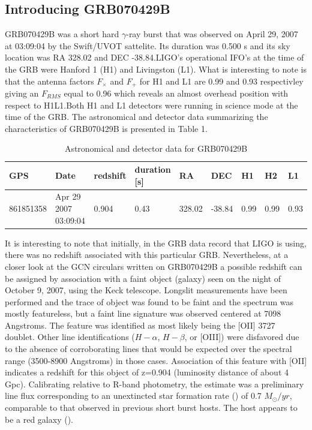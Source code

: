 \documentclass[epsf]{article}
\begin{document}
\subsection{Introducing GRB070429B}

GRB070429B was a short hard $\gamma$-ray burst that was observed on April 29, 2007 at 03:09:04 by the Swift/UVOT sattelite. Its duration was 0.500 s and its sky location was RA 328.02 and DEC -38.84.LIGO's operational IFO's at the time of the GRB were Hanford 1 (H1) and Livingston (L1). What is interesting to note is that the antenna factors $F_{\times}$ and $F_+$ for H1 and L1 are 0.99 and 0.93 respectivley giving an $F_{RMS}$ equal to 0.96 which reveals an almost overhead position with respect to H1L1.Both H1 and L1 detectors were running in science mode at the time of the GRB. 
The astronomical and detector data summarizing the characteristics of GRB070429B is presented in Table 1. 

\begin{table}[ht]
 \begin{tabular}{|l|l|l|l|l|l|l|l|l|}
 \hline
 \hline
 GPS & Date & redshift & duration [s] & RA & DEC & H1 & H2 & L1 \\
 \hline
 861851358 & Apr 29 2007 03:09:04 & 0.904 & 0.43 & 328.02 & -38.84 & 0.99 & 0.99 & 0.93 \\
 \hline
 \hline
 \end{tabular} 
 \caption{Astronomical and detector data for GRB070429B}
 \label{Table 1}
\end{table}

 It is interesting to note that initially, in the GRB data record that LIGO is using, there was no redshift associated with this particular GRB. Nevertheless, at a closer look at the GCN circulars written on GRB070429B a possible redshift can be assigned by association with a faint object (galaxy) seen on the night of October 9, 2007, using the Keck telescope. Longslit measurements have been performed and the trace of object was found to be faint and the spectrum was mostly featureless, but a faint line signature was observed centered at 7098 Angstroms. The feature was identified as most likely being the [OII] 3727 doublet. Other line identifications ($H-\alpha$, $H-\beta$, or [OIII]) were disfavored due to the absence of corroborating lines that would be expected over the spectral range (3500-8900 Angstroms) in those cases. Association of this feature with [OII] indicates a redshift for this object of z=0.904 (luminosity distance of about 4 Gpc). Calibrating relative to R-band photometry, the estimate was a preliminary line flux corresponding to an unextincted star formation rate (\cite{nakar}) of 0.7 $M_{\odot}/yr$, comparable to that observed in previous short burst hosts. The host appears to be a red galaxy (\cite{gcn}). 
\end{document}
